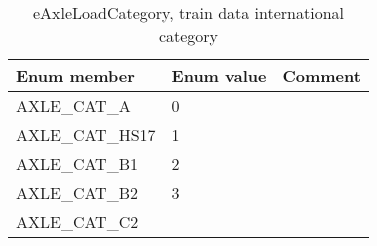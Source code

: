 \documentclass{template/openetcs_article}
\begin{document}
\newpage
\begin{longtable}{|l|l|l|}
	\caption{eAxleLoadCategory, train data international category} \\ 
	\hline
		\begin{minipage}[t]{0.45\linewidth} \textbf{Enum member}	\end{minipage}
	&	\begin{minipage}[t]{0.10\linewidth} \textbf{Enum value}	\end{minipage} 
	&	\begin{minipage}[t]{0.50\linewidth} \textbf{Comment} \end{minipage} \\
	\hline
		\begin{minipage}[t]{0.45\linewidth} AXLE\_CAT\_A \end{minipage} 
	&	\begin{minipage}[t]{0.10\linewidth} 0 \end{minipage} 
	&	\begin{minipage}[t]{0.50\linewidth} \end{minipage}\\
	\hline
		\begin{minipage}[t]{0.45\linewidth} AXLE\_CAT\_HS17 \end{minipage} 
	&	\begin{minipage}[t]{0.10\linewidth} 1 \end{minipage} 
	&	\begin{minipage}[t]{0.50\linewidth} \end{minipage}\\
	\hline
		\begin{minipage}[t]{0.45\linewidth} AXLE\_CAT\_B1 \end{minipage} 
	&	\begin{minipage}[t]{0.10\linewidth} 2 \end{minipage} 
	&	\begin{minipage}[t]{0.50\linewidth} \end{minipage}\\
	\hline
		\begin{minipage}[t]{0.45\linewidth} AXLE\_CAT\_B2 \end{minipage} 
	&	\begin{minipage}[t]{0.10\linewidth} 3 \end{minipage} 
	&	\begin{minipage}[t]{0.50\linewidth} \end{minipage}\\
	\hline
		\begin{minipage}[t]{0.45\linewidth} AXLE\_CAT\_C2\end{minipage} 

\end{longtable}
\end{document}
